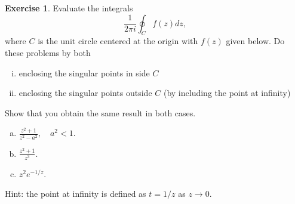 \documentclass[12pt]{article}
\theoremstyle{definition}
\newtheorem{exer}{Exercise}
\theoremstyle{remark}
\begin{document}
\begin{exer}
    Evaluate the integrals 
    \begin{equation}
        \frac{1}{2\pi i} \oint_C f(z)dz,
    \end{equation}
    where $C$ is the unit circle centered at the origin with $f(z)$ given below. Do these problems by both
    \begin{enumerate}[(i)]
        \item enclosing the singular points in side $C$
        \item enclosing the singular points outside $C$ (by including the point at infinity)
    \end{enumerate}
    Show that you obtain the same result in both cases.
    \begin{enumerate}[(a)]
        \item  $ \frac{z^2+1}{z^2-a^2}, \quad a^2 <1$.
        \item $ \frac{z^2 + 1}{z^3} $.
        \item $ z^2e^{-1/z}$.
    \end{enumerate}
    Hint: the point at infinity is defined as $t = 1/z$ as $z\to 0$.
\end{exer}
 
\end{document}
